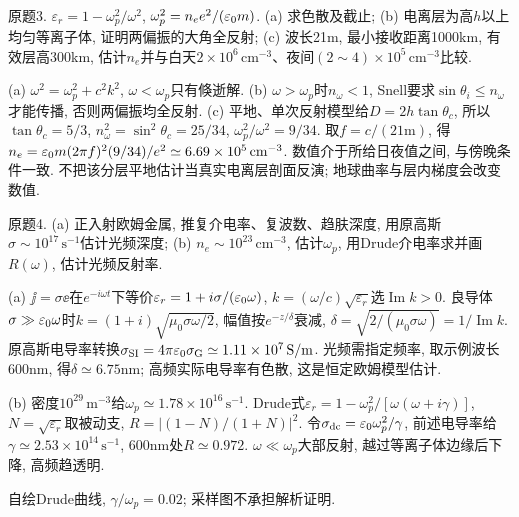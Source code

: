 \begin{exercise}
原题3. $\varepsilon_r=1-\omega_p^2/\omega^2$, $\omega_p^2=n_e e^2/(\varepsilon_0 m)$. (a) 求色散及截止; (b) 电离层为高$h$以上均匀等离子体, 证明两偏振的大角全反射; (c) 波长21m, 最小接收距离1000km, 有效层高300km, 估计$n_e$并与白天$2\times10^6\,\mathrm{cm}^{-3}$、夜间$(2\!\sim\!4)\times10^5\,\mathrm{cm}^{-3}$比较.
\end{exercise}
\begin{solution}
(a) $\omega^2=\omega_p^2+c^2k^2$, $\omega<\omega_p$只有倏逝解. (b) $\omega>\omega_p$时$n_\omega<1$, Snell要求$\sin\theta_i\le n_\omega$才能传播, 否则两偏振均全反射. (c) 平地、单次反射模型给$D=2h\tan\theta_c$, 所以$\tan\theta_c=5/3$, $n_\omega^2=\sin^2\theta_c=25/34$, $\omega_p^2/\omega^2=9/34$. 取$f=c/(21\mathrm m)$, 得$n_e=\varepsilon_0 m(2\pi f)^2(9/34)/e^2\simeq6.69\times10^5\,\mathrm{cm}^{-3}$. 数值介于所给日夜值之间, 与傍晚条件一致. 不把该分层平地估计当真实电离层剖面反演; 地球曲率与层内梯度会改变数值.
\end{solution}
\begin{exercise}
原题4. (a) 正入射欧姆金属, 推复介电率、复波数、趋肤深度, 用原高斯$\sigma\sim10^{17}\,\mathrm s^{-1}$估计光频深度; (b) $n_e\sim10^{23}\,\mathrm{cm}^{-3}$, 估计$\omega_p$, 用Drude介电率求并画$R(\omega)$, 估计光频反射率.
\end{exercise}
\begin{solution}
(a) $\jj=\sigma\ee$在$e^{-i\omega t}$下等价$\varepsilon_r=1+i\sigma/(\varepsilon_0\omega)$, $k=(\omega/c)\sqrt{\varepsilon_r}$选$\operatorname{Im}k>0$. 良导体$\sigma\gg\varepsilon_0\omega$时$k=(1+i)\sqrt{\mu_0\sigma\omega/2}$, 幅值按$e^{-z/\delta}$衰减, $\delta=\sqrt{2/(\mu_0\sigma\omega)}=1/\operatorname{Im}k$. 原高斯电导率转换$\sigma_{\rm SI}=4\pi\varepsilon_0\sigma_{\rm G}\simeq1.11\times10^7\,\mathrm{S/m}$. 光频需指定频率, 取示例波长600nm, 得$\delta\simeq6.75$nm; 高频实际电导率有色散, 这是恒定欧姆模型估计.

(b) 密度$10^{29}\,\mathrm m^{-3}$给$\omega_p\simeq1.78\times10^{16}\,\mathrm s^{-1}$. Drude式$\varepsilon_r=1-\omega_p^2/[\omega(\omega+i\gamma)]$, $N=\sqrt{\varepsilon_r}$取被动支, $R=|(1-N)/(1+N)|^2$. 令$\sigma_{\rm dc}=\varepsilon_0\omega_p^2/\gamma$, 前述电导率给$\gamma\simeq2.53\times10^{14}\,\mathrm s^{-1}$, 600nm处$R\simeq0.972$. $\omega\ll\omega_p$大部反射, 越过等离子体边缘后下降, 高频趋透明.
\begin{center}\par
自绘Drude曲线, $\gamma/\omega_p=0.02$; 采样图不承担解析证明.
\end{center}
\end{solution}
